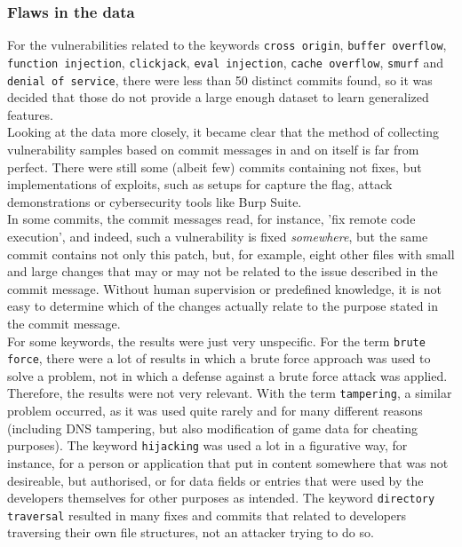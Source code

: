 \documentclass[
a4paper,
pagesize,
pdftex,
12pt,
ngerman,
fleqn,
final,
]{scrartcl}
\begin{document}
	\subsubsection{Flaws in the data}\label{data-problems}
	For the vulnerabilities related to the keywords \texttt{cross origin}, \texttt{buffer overflow}, \texttt{function injection}, \texttt{clickjack}, \texttt{eval injection}, \texttt{cache overflow}, \texttt{smurf} and \texttt{denial of service}, there were less than 50 distinct commits found, so it was decided that those do not provide a large enough dataset to learn generalized features. \\
	Looking at the data more closely, it became clear that the method of collecting vulnerability samples based on commit messages in and on itself is far from perfect. There were still some (albeit few) commits containing not fixes, but implementations of exploits, such as setups for capture the flag, attack demonstrations or cybersecurity tools like Burp Suite.\\
	In some commits, the commit messages read, for instance, 'fix remote code execution', and indeed, such a vulnerability is fixed \textit{somewhere}, but the same commit contains not only this patch, but, for example, eight other files with small and large changes that may or may not be related to the issue described in the commit message. Without human supervision or predefined knowledge, it is not easy to determine which of the changes actually relate to the purpose stated in the commit message.\\
	For some keywords, the results were just very unspecific. For the term \texttt{brute force}, there were a lot of results in which a brute force approach was used to solve a problem, not in which a defense against a brute force attack was applied. Therefore, the results were not very relevant. With the term \texttt{tampering}, a similar problem occurred, as it was used quite rarely and for many different reasons (including DNS tampering, but also modification of game data for cheating purposes). The keyword \texttt{hijacking} was used a lot in a figurative way, for instance, for a person or application that put in content somewhere that was not desireable, but authorised, or for data fields or entries that were used by the developers themselves for other purposes as intended. The keyword \texttt{directory traversal} resulted in many fixes and commits that related to developers traversing their own file structures, not an attacker trying to do so.\\
\end{document}
